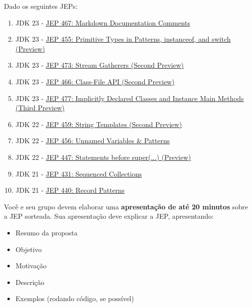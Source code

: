 \documentclass{lib/eng_softdoc}
\begin{document}
    Dado os seguintes JEPs:
    \begin{enumerate}
        \item JDK 23 - \href{https://openjdk.org/jeps/467}{JEP 467: Markdown Documentation Comments}
        \item JDK 23 - \href{https://openjdk.org/jeps/455}{JEP 455: Primitive Types in Patterns, instanceof, and switch (Preview)}
        \item JDK 23 - \href{https://openjdk.org/jeps/473}{JEP 473: Stream Gatherers (Second Preview)}
        \item JDK 23 - \href{https://openjdk.org/jeps/466}{JEP 466: Class-File API (Second Preview)}
        \item JDK 23 - \href{https://openjdk.org/jeps/477}{JEP 477: Implicitly Declared Classes and Instance Main Methods (Third Preview)}
        \item JDK 22 - \href{https://openjdk.org/jeps/459}{JEP 459: String Templates (Second Preview)}
        \item JDK 22 - \href{https://openjdk.org/jeps/456}{JEP 456: Unnamed Variables \& Patterns}
        \item JDK 22 - \href{https://openjdk.org/jeps/447}{JEP 447: Statements before super(...) (Preview)}
        \item JDK 21 - \href{https://openjdk.org/jeps/447}{JEP 431: Sequenced Collections}
        \item JDK 21 - \href{https://openjdk.org/jeps/440}{JEP 440: Record Patterns}
    \end{enumerate}

    Você e seu grupo devem elaborar uma \textbf{apresentação de até 20 minutos} sobre a JEP sorteada. Sua apresentação deve explicar a JEP, apresentando: 

    \begin{itemize}
        \item Resumo da proposta
        \item Objetivo
        \item Motivação
        \item Descrição
        \item Exemplos (rodando código, se possível)
    \end{itemize}

    
\end{document}
